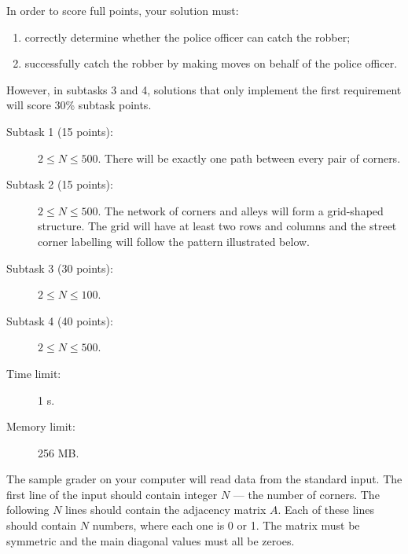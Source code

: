 \documentclass{boi2014-fi}
\begin{document}
    \Scoring
    In order to score full points, your solution must:
    \begin{enumerate}
    	\item correctly determine whether the police officer can catch
    		the robber;
	\item successfully catch the robber by making moves on behalf
		of the police officer.
    \end{enumerate}
    
    However, in subtasks 3 and 4, solutions that only implement the
    first requirement will score 30\% subtask points. 

    \begin{description}
        \item[Subtask 1 (15 points):] $2 \le N \le 500$. There will be exactly one path between every pair of corners.
        \item[Subtask 2 (15 points):] $2 \le N \le 500$. The network of corners
        and alleys will form a grid-shaped structure. The grid will have at
        least two rows and columns and the street corner labelling will follow
        the pattern illustrated below.
        \begin{figure}[h!]
           \centering
        \end{figure}
        \item[Subtask 3 (30 points):] $2 \le N \le 100$.
        \item[Subtask 4 (40 points):] $2 \le N \le 500$.
    \end{description}

    \Constraints
    
    \begin{description}
        \item[Time limit:] 1 s.
        \item[Memory limit:] 256 MB.
    \end{description}

    \Experimentation
    The sample grader on your computer will read data from the standard input.
    The first line of the input should contain integer $N$ --- the number of
    corners.  The following $N$ lines should contain the adjacency matrix $A$.
    Each of these lines should contain $N$ numbers, where each one is 0 or 1.
    The matrix must be symmetric and the main diagonal values must all be
    zeroes.
\end{document}
